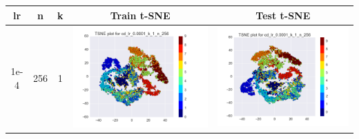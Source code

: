 \documentclass[12pt]{report}
\begin{document}
\begin{table}[H]
  \centering
  \begin{tabular}{ | c | c | c | c || c |}
    \hline
    \textbf{lr} & \textbf{n} & \textbf{k} & \textbf{Train t-SNE} & \textbf{Test t-SNE}\\ \hline
    1e-4 & 256 & 1 &
    \begin{minipage}{.3\textwidth}
      \includegraphics[scale=0.25]{cd_lr_0_0001_k_1_n_256.png}
    \end{minipage} &
    \begin{minipage}{.3\textwidth}
      \includegraphics[scale=0.25]{test_cd_lr_0_0001_k_1_n_256.png}
    \end{minipage}
    \\ \hline
  \end{tabular}
\end{table}
\end{document}
